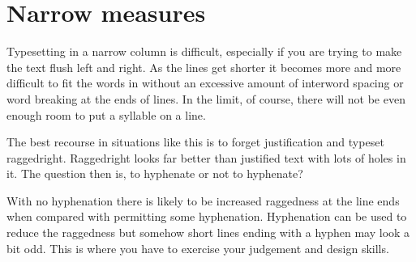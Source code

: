 \documentclass[10pt,letterpaper,extrafontsizes]{memoir}
\begin{document}

\section{Narrow measures}


    Typesetting in a narrow column is difficult, especially if you are
trying to make the text flush left and right. As the lines get shorter
it becomes more and more difficult to fit the words in without an excessive
amount of interword spacing or word breaking at the ends of lines. 
In the limit, of course, there
will not be even enough room to put a syllable on a line.

    The best recourse in situations like this is to forget justification
and typeset raggedright. 
Raggedright looks far better than justified
text with lots of holes in it.
The question then is, to hyphenate or not to hyphenate?

    With no hyphenation there is likely to be increased raggedness at
the line ends when compared with permitting some hyphenation. Hyphenation
can be used to reduce the raggedness but somehow short lines ending with
a hyphen may look a bit odd. This is where you have to exercise your
judgement and design skills.





\newlength{\rag}
  \setlength{\rag}{0.25\textwidth} %
  \addtolength{\rag}{10pt} 
  \addtolength{\rag}{9pt}  
\setlength{\rag}{107pt}
\newcommand{\ragtext}{%
The \ltx\ document preparation system is a special version of
Donald Knuth's \tx\ program. \tx\ is a sophisticated program
designed to produce high-quality typesetting, especially for
mathamatical works. It is extremely flexible albeit somewhat 
idiosynchratic. One can typeset justified, flushleft-raggedright,
centered, or raggedleft-flushright.}
\end{document}
